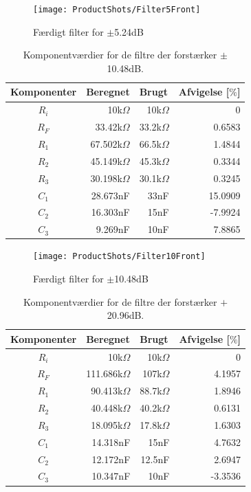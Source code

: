 %
\begin{figure}[H]
	\centering
	\texttt{[image: ProductShots/Filter5Front]}
	\caption{Færdigt filter for $\pm$5.24dB}
	\label{fig:Filter5Front}
\end{figure}
\noindent
%
%
\begin{table}[H]
\centering
\begin{tabular}{|c|r|r|r|}
\hline
\multicolumn{1}{|l|}{Komponenter} & \multicolumn{1}{l|}{Beregnet} & \multicolumn{1}{l|}{Brugt} & \multicolumn{1}{l|}{Afvigelse [$\%$]}\\ \hline
$R_i$ & 10k$\Omega$ & 10k$\Omega$ & 0\\ \hline
$R_F$ & 33.42k$\Omega$ & 33.2k$\Omega$ & 0.6583 \\ \hline
$R_1$ & 67.502k$\Omega$ & 66.5k$\Omega$ & 1.4844 \\ \hline
$R_2$ & 45.149k$\Omega$ & 45.3k$\Omega$ & 0.3344 \\ \hline
$R_3$ & 30.198k$\Omega$ & 30.1k$\Omega$ & 0.3245 \\ \hline
$C_1$ & 28.673nF & 33nF & 15.0909 \\ \hline
$C_2$ & 16.303nF & 15nF & -7.9924 \\ \hline
$C_3$ & 9.269nF & 10nF & 7.8865 \\ \hline
\end{tabular}
\caption{Komponentværdier for de filtre der forstærker $\pm$10.48dB.}
\label{tab:TilpasningAfFiltre10.48}
\end{table}
%
\begin{figure}[H]
	\centering
	\texttt{[image: ProductShots/Filter10Front]}
	\caption{Færdigt filter for $\pm$10.48dB}
	\label{fig:Filter10Front}
\end{figure}
\noindent
%
%
\begin{table}[H]
\centering
\begin{tabular}{|c|r|r|r|}
\hline
\multicolumn{1}{|l|}{Komponenter} & \multicolumn{1}{l|}{Beregnet} & \multicolumn{1}{l|}{Brugt} & \multicolumn{1}{l|}{Afvigelse [$\%$]}\\ \hline
$R_i$ & 10k$\Omega$ & 10k$\Omega$ & 0\\ \hline
$R_F$ & 111.686k$\Omega$ & 107k$\Omega$ & 4.1957 \\ \hline
$R_1$ & 90.413k$\Omega$ & 88.7k$\Omega$ & 1.8946 \\ \hline
$R_2$ & 40.448k$\Omega$ & 40.2k$\Omega$ & 0.6131 \\ \hline
$R_3$ & 18.095k$\Omega$ & 17.8k$\Omega$ & 1.6303 \\ \hline
$C_1$ & 14.318nF & 15nF & 4.7632 \\ \hline
$C_2$ & 12.172nF & 12.5nF & 2.6947 \\ \hline
$C_3$ & 10.347nF & 10nF & -3.3536 \\ \hline
\end{tabular}
\caption{Komponentværdier for de filtre der forstærker $+$20.96dB.}
\label{tab:TilpasningAfFiltre20.96}
\end{table}
